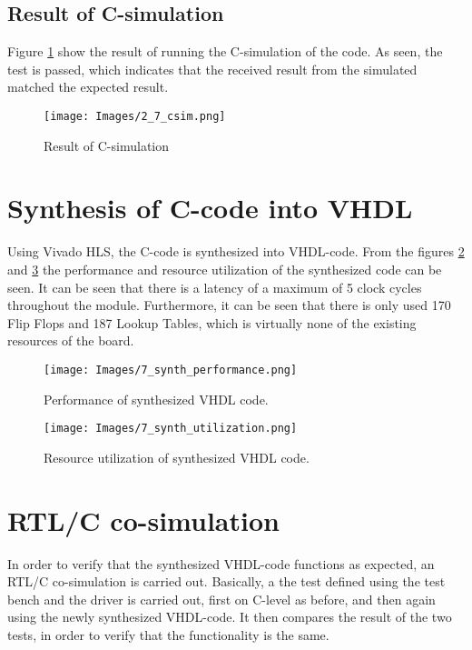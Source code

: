 \subsection{Result of C-simulation}
Figure \ref{fig:7_csim} show the result of running the C-simulation of the code. As seen, the test is passed, which indicates that the received result from the simulated matched the expected result.
\begin{figure}[H]
	\centering
	{\texttt{[image: Images/2\_7\_csim.png]}}\\[0.5cm]
	\label{fig:7_csim}
	\caption{Result of C-simulation}
\end{figure}

\section{Synthesis of C-code into VHDL}
Using Vivado HLS, the C-code is synthesized into VHDL-code. From the figures \ref{fig:7_synth_performance} and \ref{fig:7_synth_utilization} the performance and resource utilization of the synthesized code can be seen. It can be seen that there is a latency of a maximum of 5 clock cycles throughout the module. Furthermore, it can be seen that there is only used 170 Flip Flops and 187 Lookup Tables, which is virtually none of the existing resources of the board.
\begin{figure}[H]
	\centering
	{\texttt{[image: Images/7\_synth\_performance.png]}}\\[0.5cm]
	\label{fig:7_synth_performance}
	\caption{Performance of synthesized VHDL code.}
\end{figure}
\begin{figure}[H]
	\centering
	{\texttt{[image: Images/7\_synth\_utilization.png]}}\\[0.5cm]
	\label{fig:7_synth_utilization}
	\caption{Resource utilization of synthesized VHDL code.}
\end{figure}

\FloatBarrier

\section{RTL/C co-simulation}
In order to verify that the synthesized VHDL-code functions as expected, an RTL/C co-simulation is carried out. Basically, a the test defined using the test bench and the driver is carried out, first on C-level as before, and then again using the newly synthesized VHDL-code. It then compares the result of the two tests, in order to verify that the functionality is the same.

